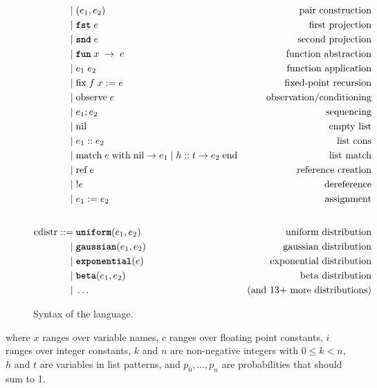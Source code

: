 \documentclass[acmsmall,screen,dvipsnames,x11names,nonacm,anonymous,review]{acmart}
\begin{document}
\begin{figure}[h]
\begin{align*}
    | &\; (e_1, e_2)                      & \text{pair construction} \\
    | &\; \fstkw \; e                     & \text{first projection} \\
    | &\; \sndkw \; e                     & \text{second projection} \\
    | &\; \funkw \; x \; \rightarrow \; e & \text{function abstraction} \\
    | &\; e_1 \; e_2                      & \text{function application} \\
    | &\; \text{fix}\; f\; x := e         & \text{fixed-point recursion} \\
    | &\; \text{observe}\; e              & \text{observation/conditioning} \\
    | &\; e_1; e_2                        & \text{sequencing} \\
    | &\; \text{nil}                      & \text{empty list} \\
    | &\; e_1 :: e_2                      & \text{list cons} \\
    | &\; \text{match}\; e\; \text{with}\; \text{nil} \rightarrow e_1 \mid h :: t \rightarrow e_2\; \text{end} & \text{list match} \\
    | &\; \text{ref}\; e                  & \text{reference creation} \\
    | &\; !e                              & \text{dereference} \\
    | &\; e_1 := e_2                      & \text{assignment} \\
    \\[1ex] %
\text{cdistr} ::= &\; \uniform(e_1, e_2)      & \text{uniform distribution} \\
           | &\; \gaussian(e_1, e_2)   & \text{gaussian distribution} \\
           | &\; \exponential(e)       & \text{exponential distribution} \\
           | &\; \betafn(e_1, e_2)     & \text{beta distribution} \\
           | &\; \ldots                & \text{(and 13+ more distributions)}
\end{align*}
\caption{Syntax of the \Slice{} language.}
\label{fig:grammar}
\end{figure}

\noindent where $x$ ranges over variable names, $c$ ranges over floating point constants, $i$ ranges over integer constants, $k$ and $n$ are non-negative integers with $0 \leq k < n$, $h$ and $t$ are variables in list patterns, and $p_0, \ldots, p_n$ are probabilities that should sum to 1.
\end{document}
